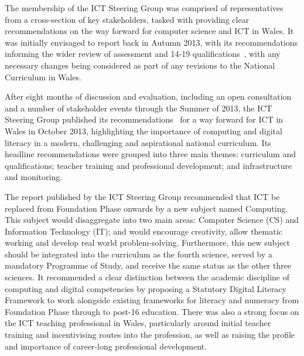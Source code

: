\documentclass{sig-alternate}
\begin{document}

The membership of the ICT Steering Group was comprised of
representatives from a cross-section of key stakeholders, tasked with
providing clear recommendations on the way forward for computer
science and ICT in Wales. It was initially envisaged to report back in
Autumn 2013, with its recommendations informing the wider review of
assessment and 14-19 qualifications~\cite{wgrev14-19:2014}, with any
necessary changes being considered as part of any revisions to the
National Curriculum in Wales.

After eight months of discussion and evaluation, including an open
consultation and a number of stakeholder events through the Summer of
2013, the ICT Steering Group published its
recommendations~\cite{welshictreview:2013} for a way forward for ICT
in Wales in October 2013, highlighting the importance of computing and
digital literacy in a modern, challenging and aspirational national
curriculum. Its headline recommendations were grouped into three main
themes: curriculum and qualifications; teacher training and
professional development; and infrastructure and monitoring.

The report published by the ICT Steering Group
recommended that ICT be replaced from Foundation Phase onwards
by a new subject named Computing.
This subject would disaggregate into two main areas:
Computer Science (CS) and Information Technology (IT);
and would encourage creativity, allow thematic working and develop
real world problem-solving.
Furthermore, this new subject should be integrated into
the curriculum as the fourth science, served by a mandatory Programme
of Study, and receive the same status as the other three sciences. It
recommended a clear distinction between the academic discipline of
computing and digital competencies by proposing a Statutory Digital
Literacy Framework to work alongside existing frameworks for literacy
and numeracy from Foundation Phase through to post-16 education. There
was also a strong focus on the ICT teaching professional in Wales,
particularly around initial teacher training and incentivising routes
into the profession, as well as raising the profile and importance of
career-long professional development.
\end{document}
